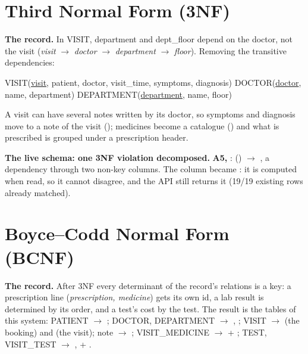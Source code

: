 \section{Third Normal Form (3NF)}
\textbf{The record.} In VISIT, department and dept\_floor depend on the doctor, not the visit
(\emph{visit} $\to$ \emph{doctor} $\to$ \emph{department} $\to$ \emph{floor}). Removing the transitive dependencies:
\begin{center}\scriptsize
VISIT(\underline{visit}, patient, doctor, visit\_time, symptoms, diagnosis) \quad DOCTOR(\underline{doctor}, name, department) \quad DEPARTMENT(\underline{department}, name, floor)
\end{center}
A visit can have several notes written by its doctor, so symptoms and diagnosis move to a note of the visit
(); medicines become a catalogue () and what is prescribed is grouped under a
prescription header.

\textbf{The live schema: one 3NF violation decomposed.} \textbf{A5, }:
() $\to$ , a dependency through two non-key columns. The column became
: it is computed when read,
so it cannot disagree, and the API still returns it (19/19 existing rows already matched).

\section{Boyce--Codd Normal Form (BCNF)}
\textbf{The record.} After 3NF every determinant of the record's relations is a key: a prescription line
(\emph{prescription, medicine}) gets its own id, a lab result is determined by its order, and a test's cost by the
test. The result is the tables of this system: PATIENT $\to$ ; DOCTOR, DEPARTMENT $\to$
, ; VISIT $\to$  (the booking) and  (the visit);
note $\to$ ; VISIT\_MEDICINE $\to$  + ; TEST,
VISIT\_TEST $\to$ ,  + .

